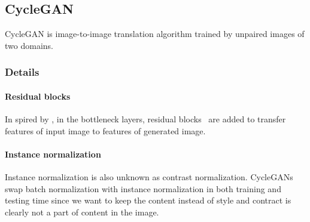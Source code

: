 \subsection{CycleGAN}
CycleGAN is image-to-image translation algorithm trained by unpaired images of two domains.
\subsubsection{Details}
\paragraph{Residual blocks}
In spired by \cite{Johnson et. al.}, in the bottleneck layers, residual blocks~\cite{ResNets} are added to transfer features of input image to features of generated image. 
\paragraph{Instance normalization}
Instance normalization is also unknown as contrast normalization. CycleGANs swap batch normalization with instance normalization in both training and testing time since we want to keep the content instead of style and contract is clearly not a part of content in the image.

